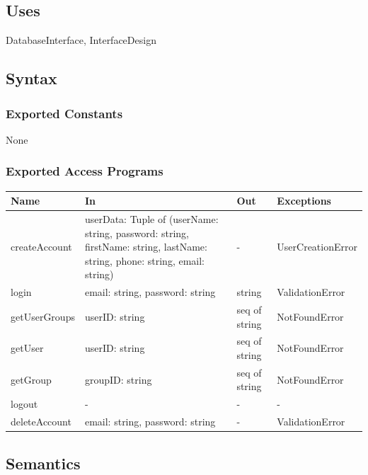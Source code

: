 \documentclass[12pt, titlepage]{article}
\begin{document}

\subsection{Uses}

DatabaseInterface, InterfaceDesign

\subsection{Syntax}

\subsubsection{Exported Constants}

None

\subsubsection{Exported Access Programs}

\begin{center}
\begin{tabular}{p{3cm} p{4.5cm} p{4cm} p{4.5cm}}
\hline
\textbf{Name} & \textbf{In} & \textbf{Out} & \textbf{Exceptions} \\
\hline
createAccount & userData: Tuple of (userName: string, password: string, firstName: string, lastName: string, phone: string, email: string) & - & UserCreationError \\
\hline
login & email: string, password: string & string & ValidationError \\
\hline
getUserGroups & userID: string & seq of string  & NotFoundError \\
\hline
getUser & userID: string & seq of string & NotFoundError \\
\hline
getGroup & groupID: string & seq of string & NotFoundError \\
\hline
logout & - & - & - \\
\hline
deleteAccount & email: string, password: string & - & ValidationError \\
\hline
\end{tabular}
\end{center}

\subsection{Semantics}
\end{document}
